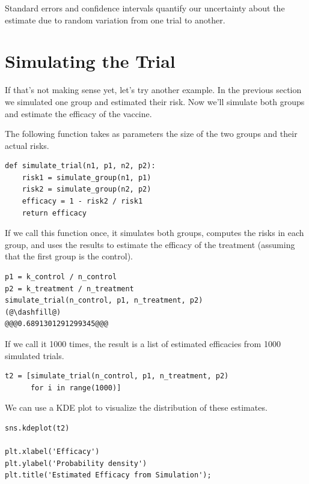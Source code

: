Standard errors and confidence intervals quantify our uncertainty about
the estimate due to random variation from one trial to another.

\hypertarget{simulating-the-trial}{%
\section{Simulating the Trial}\label{simulating-the-trial}}

If that's not making sense yet, let's try another example. In the
previous section we simulated one group and estimated their risk. Now
we'll simulate both groups and estimate the efficacy of the vaccine.

The following function takes as parameters the size of the two groups
and their actual risks.

\begin{lstlisting}[]
def simulate_trial(n1, p1, n2, p2):
    risk1 = simulate_group(n1, p1)
    risk2 = simulate_group(n2, p2)
    efficacy = 1 - risk2 / risk1
    return efficacy
\end{lstlisting}

If we call this function once, it simulates both groups, computes the
risks in each group, and uses the results to estimate the efficacy of
the treatment (assuming that the first group is the control).

\begin{lstlisting}[]
p1 = k_control / n_control
p2 = k_treatment / n_treatment
simulate_trial(n_control, p1, n_treatment, p2)
(@\dashfill@)
@@@0.6891301291299345@@@
\end{lstlisting}

If we call it 1000 times, the result is a list of estimated efficacies
from 1000 simulated trials.

\begin{lstlisting}[]
t2 = [simulate_trial(n_control, p1, n_treatment, p2)
      for i in range(1000)]
\end{lstlisting}

We can use a KDE plot to visualize the distribution of these estimates.

\begin{lstlisting}[]
sns.kdeplot(t2)

plt.xlabel('Efficacy')
plt.ylabel('Probability density')
plt.title('Estimated Efficacy from Simulation');
\end{lstlisting}


